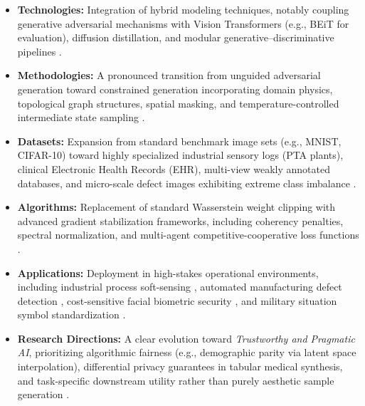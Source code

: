\documentclass[12pt,a4paper]{article}
\begin{document}
\begin{itemize}
    \item \textbf{Technologies:} Integration of hybrid modeling techniques, notably coupling generative adversarial mechanisms with Vision Transformers (e.g., BEiT for evaluation), diffusion distillation, and modular generative--discriminative pipelines \parencite{sohn2026parallelly,li2024improving}.
    
    \item \textbf{Methodologies:} A pronounced transition from unguided adversarial generation toward constrained generation incorporating domain physics, topological graph structures, spatial masking, and temperature-controlled intermediate state sampling \parencite{sohn2026parallelly,zuo2023sketched}.
    
    \item \textbf{Datasets:} Expansion from standard benchmark image sets (e.g., MNIST, CIFAR-10) toward highly specialized industrial sensory logs (PTA plants), clinical Electronic Health Records (EHR), multi-view weakly annotated databases, and micro-scale defect images exhibiting extreme class imbalance \parencite{zhu2025novel,bietsch2023electronic,zhang2023inaccurate}.
    
    \item \textbf{Algorithms:} Replacement of standard Wasserstein weight clipping with advanced gradient stabilization frameworks, including coherency penalties, spectral normalization, and multi-agent competitive-cooperative loss functions \parencite{sohn2026parallelly,li2024improving}.
    
    \item \textbf{Applications:} Deployment in high-stakes operational environments, including industrial process soft-sensing \parencite{zhu2025novel}, automated manufacturing defect detection \parencite{li2023eid}, cost-sensitive facial biometric security \parencite{chen2020generative}, and military situation symbol standardization \parencite{zuo2023sketched}.
    
    \item \textbf{Research Directions:} A clear evolution toward \textit{Trustworthy and Pragmatic AI}, prioritizing algorithmic fairness (e.g., demographic parity via latent space interpolation), differential privacy guarantees in tabular medical synthesis, and task-specific downstream utility rather than purely aesthetic sample generation \parencite{sohn2026parallelly,bietsch2023electronic}.
\end{itemize}
\end{document}
